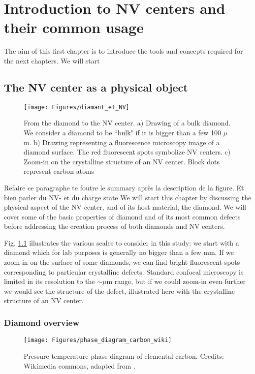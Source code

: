 \documentclass[a4paper,11pt]{report}
\title{}
\begin{document}
\chapter{Introduction to NV centers and their common usage}
The aim of this first chapter is to introduce the tools and concepts required for the next chapters. We will start

\section{The NV center as a physical object}
\begin{figure}[h!]
\centering
\texttt{[image: Figures/diamant\_et\_NV]}
\caption{From the diamond to the NV center. a) Drawing of a bulk diamond. We consider a diamond to be ``bulk" if it is bigger than a few 100 $\mu$m. b) Drawing representing a fluorescence microscopy image of a diamond surface. The red fluorescent spots symbolize NV centers. c) Zoom-in on the crystalline structure of an NV center. Block dots represent carbon atoms}
\label{diamond+NV}
\end{figure}
Refaire ce paragraphe te foutre le summary après la description de la figure. Et bien parler du NV- et du charge state
We will start this chapter by discussing the physical aspect of the NV center, and of its host material, the diamond. We will cover some of the basic properties of diamond and of its most common defects before addressing the creation process of both diamonds and NV centers.

Fig. \ref{diamond+NV} illustrates the various scales to consider in this study: we start with a diamond which for lab purposes is generally no bigger than a few mm. If we zoom-in on the surface of some diamonds, we can find bright fluorescent spots corresponding to particular crystalline defects. Standard confocal microscopy is limited in its resolution to the $\sim \mu$m range, but if we could zoom-in even further we would see the structure of the defect, illustrated here with the crystalline structure of an NV center. 
\subsection{Diamond overview}
\begin{figure}[h!]
\centering
\texttt{[image: Figures/phase\_diagram\_carbon\_wiki]}
\caption{Pressure-temperature phase diagram of elemental carbon. Credits: Wikimedia commons, adapted from \citep{bundy1989pressure, bundy1996pressure}.}
\label{carbon phase diagram}
\end{figure}
\end{document}
